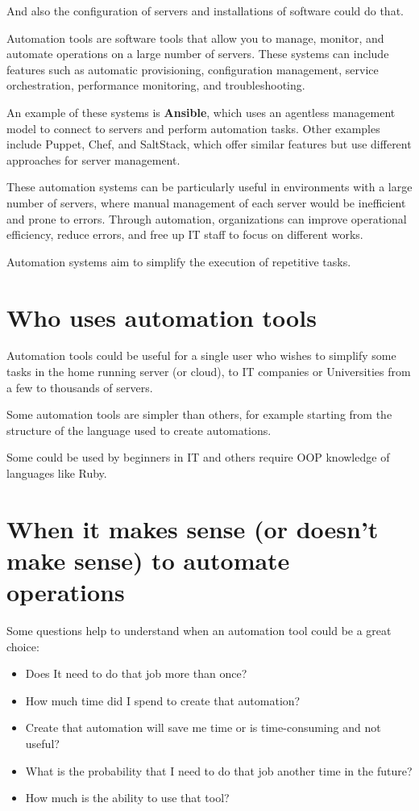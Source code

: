 \documentclass[12pt,a4paper,openright,twoside]{book}
\begin{document}
And also the configuration of servers and installations of software could do that.


Automation tools are software tools that allow you to manage, monitor, and automate operations on a large number of servers. These systems can include features such as automatic provisioning, configuration management, service orchestration, performance monitoring, and troubleshooting.


An example of these systems is \textbf{Ansible}, which uses an agentless management model to connect to servers and perform automation tasks. Other examples include Puppet, Chef, and SaltStack, which offer similar features but use different approaches for server management.


These automation systems can be particularly useful in environments with a large number of servers, where manual management of each server would be inefficient and prone to errors. Through automation, organizations can improve operational efficiency, reduce errors, and free up IT staff to focus on different works.


Automation systems aim to simplify the execution of repetitive tasks.

\section{Who uses automation tools}
Automation tools could be useful for a single user who wishes to simplify some tasks in the home running server (or cloud), to IT companies or Universities from a few to thousands of servers.

Some automation tools are simpler than others, for example starting from the structure of the language used to create automations.

Some could be used by beginners in IT and others require OOP knowledge of languages like Ruby.

\section{When it makes sense (or doesn't make sense) to automate operations}
Some questions help to understand when an automation tool could be a great choice:
\begin{itemize}
    \item Does It need to do that job more than once?
    \item How much time did I spend to create that automation?
    \item Create that automation will save me time or is time-consuming and not useful?
    \item What is the probability that I need to do that job another time in the future?
    \item How much is the ability to use that tool?
\end{itemize}
\end{document}
